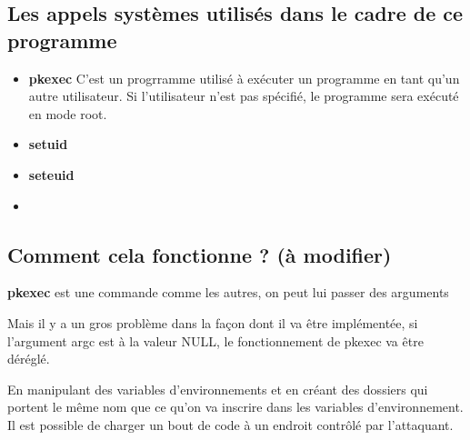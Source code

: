 \documentclass[a4paper, 12pt]{article}
\begin{document}
            \subsection{Les appels systèmes utilisés dans le cadre de ce programme}
            \begin{itemize}
                \item \textbf{pkexec} C'est un progrramme utilisé à exécuter un programme en tant qu'un autre utilisateur. Si l'utilisateur n'est pas spécifié, le programme sera exécuté en mode root. \cite{pkexec1E89:online}
                \item \textbf{setuid}  \cite{setuid2L92:online}
                \item \textbf{seteuid} \cite{seteuid224:online}
                \item 
            \end{itemize}
                 
   		\subsection{Comment cela fonctionne ? (à modifier) }
   		\begin{flushleft}
   			\noindent \textbf{pkexec} est une commande comme les autres, on peut lui passer des arguments
   			\item Mais il y a un gros problème dans la façon dont il va être implémentée, si l'argument argc est à la valeur NULL, le fonctionnement de pkexec va être déréglé. 
   			\item En manipulant des variables d'environnements et en créant des dossiers qui portent le même nom que ce qu'on va inscrire dans les variables d'environnement. Il est possible de charger un bout de code à un endroit contrôlé par l'attaquant. 
   		\end{flushleft}
   		
\end{document}
